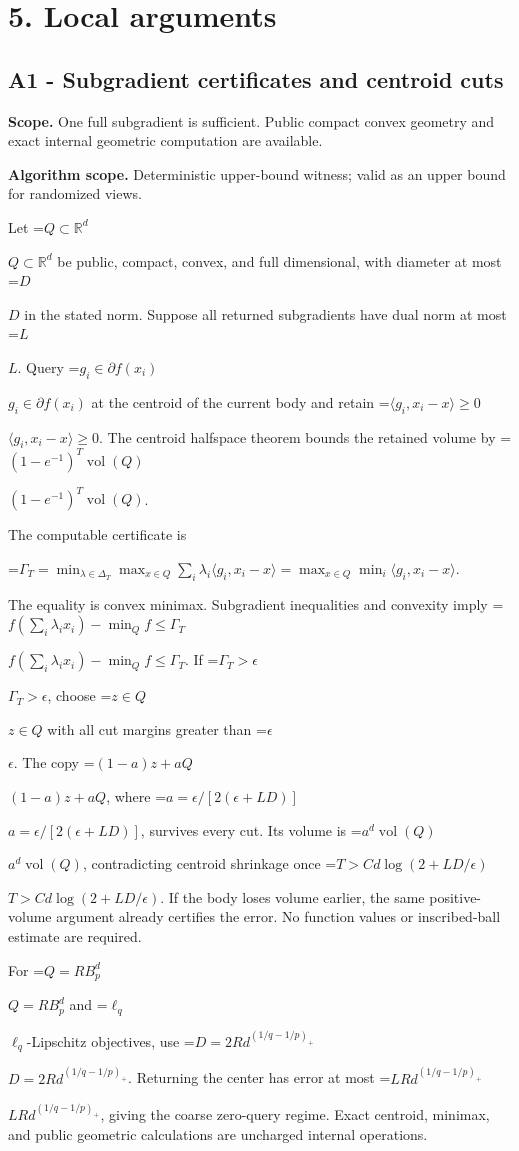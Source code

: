 \documentclass[10pt,a4paper]{article}
\newcommand{\AtlasMath}[1]{\par\begingroup\centering\setbox0=\hbox{$\displaystyle #1$}\ifdim\wd0>1.4\linewidth\typeout{ATLAS WIDE FORMULA: \the\wd0}\fi\ifdim\wd0>\linewidth\resizebox{\linewidth}{!}{\box0}\else\box0\fi\par\endgroup}
\newcommand{\AtlasInlineMath}[1]{\begingroup\setbox0=\hbox{$#1$}\ifdim\wd0>.4\linewidth\endgroup\AtlasMath{#1}\else\endgroup$#1$\fi}
\begin{document}
\section{5. Local arguments}
\subsection{A1 - Subgradient certificates and centroid cuts}
\textbf{Scope.} One full subgradient is sufficient. Public compact convex geometry and exact internal geometric computation are available.

\textbf{Algorithm scope.} Deterministic upper-bound witness; valid as an upper bound for randomized views.

Let \AtlasInlineMath{Q\subset\mathbb R^d} be public, compact, convex, and full dimensional, with diameter at most \AtlasInlineMath{D} in the stated norm. Suppose all returned subgradients have dual norm at most \AtlasInlineMath{L}. Query \AtlasInlineMath{g_i\in\partial f(x_i)} at the centroid of the current body and retain \AtlasInlineMath{\langle g_i,x_i-x\rangle\ge0}. The centroid halfspace theorem bounds the retained volume by \AtlasInlineMath{(1-e^{-1})^T\operatorname{vol}(Q)}.

The computable certificate is

\AtlasMath{\Gamma_T=\min_{\lambda\in\Delta_T}\max_{x\in Q}\sum_i\lambda_i\langle g_i,x_i-x\rangle
=\max_{x\in Q}\min_i\langle g_i,x_i-x\rangle.}

The equality is convex minimax. Subgradient inequalities and convexity imply
\AtlasInlineMath{f(\sum_i\lambda_ix_i)-\min_Qf\le\Gamma_T}.
If \AtlasInlineMath{\Gamma_T>\epsilon}, choose \AtlasInlineMath{z\in Q} with all cut margins greater than \AtlasInlineMath{\epsilon}. The copy \AtlasInlineMath{(1-a)z+aQ}, where \AtlasInlineMath{a=\epsilon/[2(\epsilon+LD)]}, survives every cut. Its volume is \AtlasInlineMath{a^d\operatorname{vol}(Q)}, contradicting centroid shrinkage once \AtlasInlineMath{T>C d\log(2+LD/\epsilon)}. If the body loses volume earlier, the same positive-volume argument already certifies the error. No function values or inscribed-ball estimate are required.

For \AtlasInlineMath{Q=RB_p^d} and \AtlasInlineMath{\ell_q}-Lipschitz objectives, use \AtlasInlineMath{D=2Rd^{(1/q-1/p)_+}}. Returning the center has error at most \AtlasInlineMath{LRd^{(1/q-1/p)_+}}, giving the coarse zero-query regime. Exact centroid, minimax, and public geometric calculations are uncharged internal operations.
\end{document}
